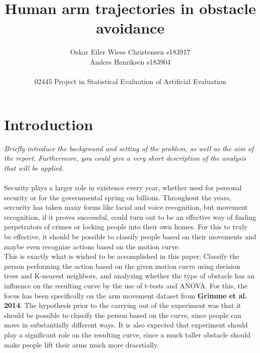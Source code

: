 \documentclass[11pt, fleqn, titlepage]{article}
\title{Human arm trajectories in obstacle avoidance}
\author{Oskar Eiler Wiese Christensen s183917 \\ Anders Henriksen s183904 \\ \\ 02445 Project in Statistical Evaluation of Artificial Evaluation}
\date{\today \vspace{2.5cm} \section*{Abstract} \textit{The summary should contain a summary of the problem that  you are working with, which results you got, as well as main conclusions. \\ Don’t get into technical details. The summary should not be very long} \\ In this paper, the goal is, using the \texttt{armdata.Rdata} dataset, to determine if people can be recognized based on their movements, and if obstacles change the movement curve of the hand of the subject in question.
\\ Lorem ipsum dolor sit amet, consectetur adipiscing elit, sed do eiusmod tempor incididunt ut labore et dolore magna aliqua. Gravida arcu ac tortor dignissim. Et netus et malesuada fames. Convallis posuere morbi leo urna molestie at elementum eu facilisis. Etiam erat velit scelerisque in dictum non. Mollis nunc sed id semper risus in hendrerit gravida. Cursus euismod quis viverra nibh cras pulvinar mattis nunc sed. Eu tincidunt tortor aliquam nulla. Duis convallis convallis tellus id interdum. Nunc lobortis mattis aliquam faucibus purus in massa tempor. Feugiat sed lectus vestibulum mattis ullamcorper. Malesuada proin libero nunc consequat interdum varius. Sed pulvinar proin gravida hendrerit lectus. Varius morbi enim nunc faucibus a. Ultricies leo integer malesuada nunc vel risus commodo viverra maecenas. Id aliquet lectus proin nibh nisl. Ullamcorper velit sed ullamcorper morbi tincidunt.}
\begin{document}
\maketitle

\section{Introduction}
\textit{Briefly introduce the background and setting of the problem, as well as the aim of the report. Furthermore, you could give a very short description of the analysis that will be applied.} \\ \\
Security plays a larger role in existence every year, whether used for personal security or for the governmental spying on billions. Throughout the years, sercurity has taken many forms like facial and voice recognition, but movement recognition, if it proves successful, could turn out to be an effective way of finding perpetrators of crimes or locking people into their own homes. For this to truly be effective, it should be possible to classify people based on their movements and maybe even recognize actions based on the motion curve. \\ 
\indent This is exactly what is wished to be accomplished in this paper; Classify the person performing the action based on the given motion curve using decision trees and K-nearest neighbors, and analyzing whether the type of obstacle has an influence on the resulting curve by the use of t-tests and ANOVA. For this, the focus has been specifically on the arm movement dataset from \textbf{Grimme et al. 2014}. The hypothesis prior to the carrying out of the experiment was that it should be possible to classify the person based on the curve, since people can move in substantially different ways. It is also expected that experiment should play a significant role on the resulting curve, since a much taller obstacle should make people lift their arms much more dracstially.
\end{document}
